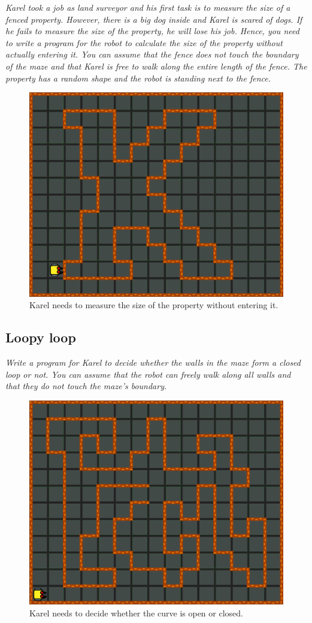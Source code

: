 {{\noindent
{\em Karel took a job as land surveyor and his first task is to measure the size of a fenced property. However, there is a big dog inside and Karel is scared of dogs. If he fails to measure the size of the property, he will lose his job. Hence, you need to write a program for the robot to calculate the size of the property without actually entering it. You can assume that the fence does not touch the boundary of the maze and that Karel is free to walk along the entire length of the fence. The property has a random shape and the robot is standing next to the fence.}

\begin{figure}[!ht]
\begin{center}
\includegraphics[height=0.4\textwidth]{img/j01.png}
\end{center}
\vspace{-4mm}
\caption{Karel needs to measure the size of the property without entering it.}
\label{fig:j01}
\end{figure}

\newpage
\subsection{Loopy loop}

\noindent
{\em Write a program for Karel to decide whether the walls in the maze form a closed loop or not. You can assume that the robot can freely walk along all walls and that they do not touch the maze's boundary.  }

\begin{figure}[!ht]
\begin{center}
\includegraphics[height=0.4\textwidth]{img/j03.png}
\end{center}
\vspace{-4mm}
\caption{Karel needs to decide whether the curve is open or closed.}
\label{fig:j03}
\end{figure}


}}
